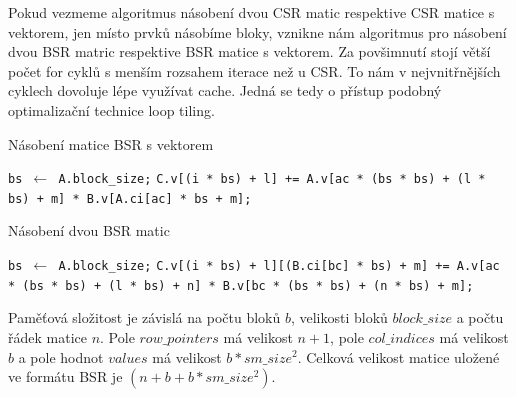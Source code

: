 Pokud vezmeme algoritmus násobení dvou CSR matic respektive CSR matice s vektorem, jen místo prvků násobíme bloky, vznikne nám algoritmus pro násobení dvou BSR matric respektive BSR matice s vektorem. Za povšimnutí stojí větší počet for cyklů s menším rozsahem iterace než u CSR. To nám v nejvnitřnějších cyklech dovoluje lépe využívat cache. Jedná se tedy o přístup podobný optimalizační technice loop tiling\cite{Wolf:1991:DLO:113445.113449}.

\label{alg:bsr-mvm}
\begin{algorithm}[H]
	\caption{Násobení matice BSR s vektorem}\label{bsr-mvm}
	\begin{algorithmic}[1]
		\State \texttt{bs $\gets$ A.block\_size;}
						\State \texttt{C.v[(i * bs) + l] += A.v[ac * (bs * bs) + (l * bs) + m] * B.v[A.ci[ac] * bs + m];}
					\EndFor
				\EndFor
			\EndFor
		\EndFor
		\EndProcedure
	\end{algorithmic}
\end{algorithm}

\label{alg:bsr-mmm}
\begin{algorithm}[H]
	\caption{Násobení dvou BSR matic}\label{bsr-mmm}
	\begin{algorithmic}[1]
		\State \texttt{bs $\gets$ A.block\_size;}
								\State \texttt{C.v[(i * bs) + l][(B.ci[bc] * bs) + m] += A.v[ac * (bs * bs) + (l * bs) + n] * B.v[bc * (bs * bs) + (n * bs) + m];}
							\EndFor
						\EndFor
					\EndFor
				\EndFor
			\EndFor
		\EndFor
		\EndProcedure
	\end{algorithmic}
\end{algorithm}

Paměťová složitost je závislá na počtu bloků $b$, velikosti bloků $block\_size$ a počtu řádek matice $n$. Pole $row\_pointers$ má velikost $n+1$, pole $col\_indices$ má velikost $b$ a pole hodnot $values$ má velikost $b * sm\_size^2$. Celková velikost matice uložené ve formátu BSR je \bigO$(n + b + b * sm\_size^2)$. 

